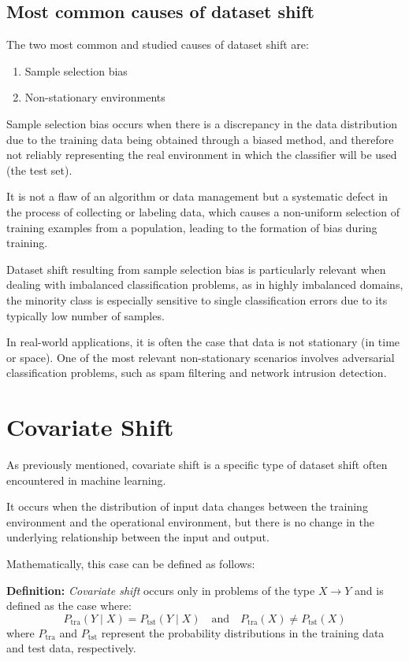 	
\subsection{Most common causes of dataset shift}
	
The two most common and studied causes of dataset shift are:

\begin{enumerate}
	\item Sample selection bias
	\item Non-stationary environments
\end{enumerate}


Sample selection bias occurs when there is a discrepancy in the data distribution due to the training data being obtained through a biased method, and therefore not reliably representing the real environment in which the classifier will be used (the test set).

It is not a flaw of an algorithm or data management but a systematic defect in the process of collecting or labeling data, which causes a non-uniform selection of training examples from a population, leading to the formation of bias during training.

Dataset shift resulting from sample selection bias is particularly relevant when dealing with imbalanced classification problems, as in highly imbalanced domains, the minority class is especially sensitive to single classification errors due to its typically low number of samples.

In real-world applications, it is often the case that data is not stationary (in time or space). One of the most relevant non-stationary scenarios involves adversarial classification problems, such as spam filtering and network intrusion detection.
	

\section{Covariate Shift}

As previously mentioned, covariate shift is a specific type of dataset shift often encountered in machine learning.
	
It occurs when the distribution of input data changes between the training environment and the operational environment, but there is no change in the underlying relationship between the input and output.  
	
Mathematically, this case can be defined as follows:  
	
	\vspace{0.5cm}  
	\textbf{Definition:} \textit{Covariate shift} occurs only in problems of the type \(X \to Y\) and is defined as the case where:  
	\[
	P_{\text{tra}}(Y \mid X) = P_{\text{tst}}(Y \mid X) \quad \text{and} \quad P_{\text{tra}}(X) \neq P_{\text{tst}}(X)
	\]
	where \(P_{\text{tra}}\) and \(P_{\text{tst}}\) represent the probability distributions in the training data and test data, respectively.  
	\vspace{0.5cm}  
	
